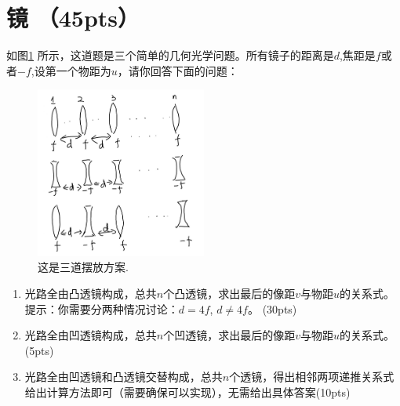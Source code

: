 \section{镜 （45pts）}
如图\ref{mirror} 所示，这道题是三个简单的几何光学问题。所有镜子的距离是\(d\),焦距是\(f\)或者\(-f\),设第一个物距为\(u\)，请你回答下面的问题：
\begin{figure}[htbp]
	\centering
	\includegraphics[width=0.5\textwidth]{mirror}
	\caption{这是三道摆放方案.}
	\label{mirror}
\end{figure}
\begin{enumerate}
	\item 光路全由凸透镜构成，总共\(n\)个凸透镜，求出最后的像距\(v\)与物距\(u\)的关系式。提示：你需要分两种情况讨论：\(d=4f\), \(d\neq 4f\)。 (30pts)
	\item 光路全由凹透镜构成，总共\(n\)个凹透镜，求出最后的像距\(v\)与物距\(u\)的关系式。(5pts)
	\item 光路全由凹透镜和凸透镜交替构成，总共\(n\)个透镜，得出相邻两项递推关系式给出计算方法即可（需要确保可以实现），无需给出具体答案(10pts) 
\end{enumerate}
